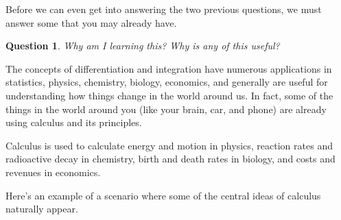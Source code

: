 \documentclass[12pt]{article}
\newtheorem{quest}[thm]{Question}
\theoremstyle{definition}
\theoremstyle{plain}
\numberwithin{equation}{section}
\begin{document}
Before we can even get into answering the two previous questions, we must answer some that you may already have.

\begin{quest}
Why am I learning this?	Why is any of this useful?
\end{quest}

The concepts of differentiation and integration have numerous applications in statistics, physics, chemistry, biology, economics, and generally are useful for understanding how things change in the world around us. In fact, some of the things in the world around you (like your brain, car, and phone) are already using calculus and its principles.

Calculus is used to calculate energy and motion in physics, reaction rates and radioactive decay in chemistry, birth and death rates in biology, and costs and revenues in economics.

Here's an example of a scenario where some of the   central ideas of calculus naturally appear.
\end{document}
